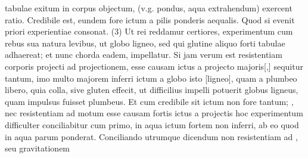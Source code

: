 {} tabulae exitum in corpus objectum, (v.g. pondus, aqua extrahendum) exercent ratio. Credibile est, eundem fore ictum\protect{} a pilis\protect{} ponderis aequalis. Quod si evenit priori experientiae consonat.
\pend
\count{}
\pstart
(3) Ut rei reddamur certiores, experimentum cum rebus sua natura levibus, ut globo ligneo, sed qui glutine aliquo forti tabulae adhaereat; et nunc chorda eadem, impellatur. Si jam verum est resistentiam\protect{} corporis projecti ad projectionem, esse causam ictus\protect{} a projecto majoris[,] sequitur tantum, imo multo majorem inferri ictum\protect{} a globo isto [ligneo], quam a plumbeo libero, quia colla, sive gluten effecit, ut difficilius impelli potuerit globus ligneus, quam impulsus fuisset plumbeus. Et cum credibile sit ictum\protect{} non fore tantum; , nec resistentiam\protect{} ad motum esse causam fortis ictus\protect{} a projectis  hoc experimentum difficulter conciliabitur cum primo,  in aqua ictum\protect{} fortem non inferri, ab eo quod in aqua parum ponderat. Conciliando utrumque 
\noindent dicendum non resistentiam\protect{} ad ,  seu gravitationem\protect{} 
